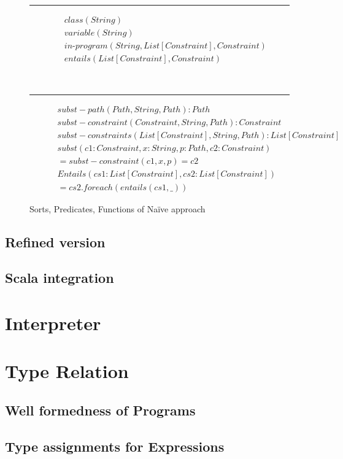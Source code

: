 \begin{figure}[t]
\begin{subfigure}[c]{1\textwidth}
\label{subfig:axioms-naive-general-sorts}
\end{subfigure}\\
\hrule
\begin{subfigure}[c]{1\textwidth}
\centering
\begin{align*}
&\mathit{class}(\mathit{String}) \\
&\mathit{variable}(\mathit{String})\\
&\mathit{in\text{-}program}(\mathit{String},\mathit{List[Constraint]}, \mathit{Constraint}) \\
&\mathit{entails}(\mathit{List[Constraint]}, \mathit{Constraint})
\end{align*}
\label{subfig:axioms-naive-general-predicates}
\end{subfigure}\\
\hrule
\begin{subfigure}[c]{1\textwidth}
\centering
\begin{align*}
\mathit{subst-path(Path, String, Path): Path} \\
\mathit{subst-constraint(Constraint, String, Path): Constraint} \\
\mathit{subst-constraints(List[Constraint], String, Path): List[Constraint]} \\
\mathit{subst(c1: Constraint, x: String, p: Path, c2: Constraint)} \\
= \mathit{subst-constraint(c1, x, p) = c2} \\
\mathit{Entails(cs1: List[Constraint], cs2: List[Constraint])} \\
= \mathit{cs2.foreach(entails(cs1, \_))}
\end{align*}
\label{subfig:axioms-naive-general-funs}
\end{subfigure}
\caption{Sorts, Predicates, Functions of Na\"ive approach}
\label{fig:axioms-naive-general}
\end{figure}

\subsection{Refined version}
\subsection{Scala integration}

\section{Interpreter}
\section{Type Relation}
\subsection{Well formedness of Programs}
\subsection{Type assignments for Expressions}

